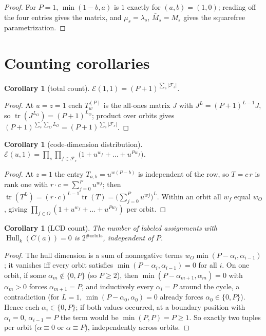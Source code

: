 \documentclass[10pt,journal,draftclsnofoot,onecolumn]{IEEEtran}
\newtheorem{corollary}[theorem]{Corollary}
\theoremstyle{definition}
\theoremstyle{remark}
\newcommand{\Hull}{\operatorname{Hull}}
\newcommand{\tr}{\operatorname{tr}}
\begin{document}
\begin{proof}
For \(P=1\), \(\min(1-b, a)\) is \(1\) exactly for \((a,b) = (1,0)\);
reading off the four entries gives the matrix, and \(\mu_s = \lambda_s\),
\(\bar M_s = M_s\) gives the squarefree parametrization.
\end{proof}

\section{Counting corollaries}\label{sec:corollaries}

\begin{corollary}[total count]\label{cor:C1}
\(\mathcal{E}(1,1) = (P+1)^{\sum_s |\mathcal{F}_s|}\).
\end{corollary}

\begin{proof}
At \(u=z=1\) each \(T^{(P)}_w\) is the all-ones matrix \(J\) with
\(J^L = (P+1)^{L-1} J\), so \(\tr(J^{L_O}) = (P+1)^{L_O}\); product over
orbits gives \((P+1)^{\sum_s \sum_O L_O} = (P+1)^{\sum_s |\mathcal{F}_s|}\).
\end{proof}

\begin{corollary}[code-dimension distribution]\label{cor:C2}
\(\displaystyle
\mathcal{E}(u,1) = \prod_{s} \prod_{f \in \mathcal{F}_s}
\big(1 + u^{w_f} + \dots + u^{P w_f}\big)\).
\end{corollary}

\begin{proof}
At \(z=1\) the entry \(T_{a,b} = u^{w(P-b)}\) is independent of the row,
so \(T = c\,r\) is rank one with \(r \cdot c = \sum_{j=0}^{P} u^{wj}\);
then \(\tr(T^L) = (r\cdot c)^{L-1} \tr(T) = \big(\sum_{j=0}^P u^{wj}\big)^L\).
Within an orbit all \(w_f\) equal \(w_O\), giving
\(\prod_{f \in O} (1 + u^{w_f} + \dots + u^{Pw_f})\) per orbit.
\end{proof}

\begin{corollary}[LCD count]\label{cor:C3}
The number of labeled assignments with \(\Hull_k(C(a)) = 0\) is
\(2^{\#\text{orbits}}\), independent of \(P\).
\end{corollary}

\begin{proof}
The hull dimension is a sum of nonnegative terms
\(w_O \min(P-\alpha_i, \alpha_{i-1})\); it vanishes iff every orbit
satisfies \(\min(P-\alpha_i, \alpha_{i-1}) = 0\) for all \(i\). On one
orbit, if some \(\alpha_m \notin \{0,P\}\) (so \(P \ge 2\)), then
\(\min(P-\alpha_{m+1}, \alpha_m) = 0\) with \(\alpha_m > 0\) forces
\(\alpha_{m+1} = P\), and inductively every \(\alpha_i = P\) around the
cycle, a contradiction (for \(L=1\), \(\min(P-\alpha_0,\alpha_0) = 0\)
already forces \(\alpha_0 \in \{0,P\}\)). Hence each \(\alpha_i \in
\{0,P\}\); if both values occurred, at a boundary position with
\(\alpha_i = 0\), \(\alpha_{i-1} = P\) the term would be
\(\min(P,P) = P \ge 1\). So exactly two tuples per orbit
(\(\alpha \equiv 0\) or \(\alpha \equiv P\)), independently across
orbits.
\end{proof}
\end{document}
